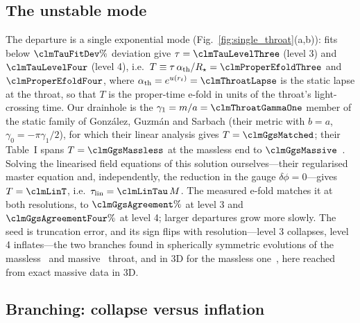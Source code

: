 \documentclass[twocolumn,floatfix,aps,prd,superscriptaddress,nofootinbib]{revtex4-2}
\begin{document}
\subsection{The unstable mode}
\label{sec:single:instability}

The departure is a single exponential mode (Fig.~\ref{fig:single_throat}(a,b)): fits below $\clmTauFitDev\%$ deviation give $\tau=\clmTauLevelThree$ (level 3) and $\clmTauLevelFour$ (level 4), i.e.\ $T\equiv\tau\,\alpha_{\rm th}/R_\star=\clmProperEfoldThree$ and $\clmProperEfoldFour$, where $\alpha_{\rm th}=e^{u(r_t)}=\clmThroatLapse$ is the static lapse at the throat, so that $T$ is the proper-time e-fold in units of the throat's light-crossing time. Our drainhole is the $\gamma_1=m/a=\clmThroatGammaOne$ member of the static family of Gonz\'alez, Guzm\'an and Sarbach (their metric with $b=a$, $\gamma_0=-\pi\gamma_1/2$), for which their linear analysis gives $T=\clmGgsMatched$; their Table~I spans $T=\clmGgsMassless$ at the massless end to $\clmGgsMassive$~\cite{gonzalez2009lin}. Solving the linearised field equations of this solution ourselves---their regularised master equation and, independently, the reduction in the gauge $\delta\phi=0$---gives $T=\clmLinT$, i.e.\ $\tau_{\rm lin}=\clmLinTau\,M$. The measured e-fold matches it at both resolutions, to $\clmGgsAgreement\%$ at level 3 and $\clmGgsAgreementFour\%$ at level 4; larger departures grow more slowly. The seed is truncation error, and its sign flips with resolution---level 3 collapses, level 4 inflates---the two branches found in spherically symmetric evolutions of the massless~\cite{shinkai2002,calhoun2022} and massive~\cite{gonzalez2009,xu2025} throat, and in 3D for the massless one~\cite{shirokov2026}, here reached from exact massive data in 3D.

\subsection{Branching: collapse versus inflation}
\label{sec:single:branching}
\end{document}
